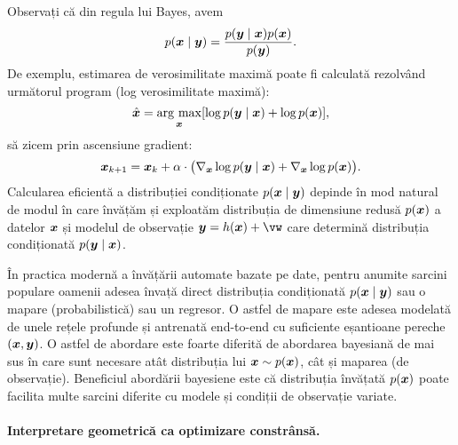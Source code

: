 \documentclass[../../book-main_ro.tex]{subfiles}
\begin{document}
Observați că din regula lui Bayes, avem
\begin{equation}
  p(\bm{x}\mid \bm{y}) = \frac{p(\bm{y}\mid \bm{x}) p(\bm{x}) }{p(\bm{y})}.
\end{equation} 
De exemplu, estimarea de verosimilitate maximă poate fi calculată rezolvând următorul program (log verosimilitate maximă):
\begin{equation}
    \hat{\bm{x}} = \operatorname*{arg\ max}_{\bm{x}} [\log p(\bm{y}\mid \bm{x}) + \log p(\bm{x})], 
\end{equation}
să zicem prin ascensiune gradient:
\begin{equation}
    \bm{x}_{k+1} = \bm{x}_k + \alpha \cdot \big(\nabla_{\bm{x}} \log p(\bm{y} \mid \bm{x}) + \nabla_{\bm{x}} \log p(\bm{x})\big).
    \label{eqn:loglikelihoo-gradient-ascent}
\end{equation}
Calcularea eficientă a distribuției condiționate $p(\bm{x} \mid \bm{y})$ depinde în mod natural de modul în care învățăm și exploatăm distribuția de dimensiune redusă $p(\bm{x})$ a datelor $\bm{x}$ și modelul de observație $\y = h(\x) + \vw$ care determină distribuția condiționată $p(\bm{y} \mid \bm{x})$.

\begin{remark}
În practica modernă a învățării automate bazate pe date, pentru anumite sarcini populare oamenii adesea învață direct distribuția condiționată $p(\bm{x}\mid \bm{y})$ sau o mapare (probabilistică) sau un regresor. O astfel de mapare este adesea modelată de unele rețele profunde și antrenată end-to-end cu suficiente eșantioane pereche $(\bm{x}, \bm{y})$. O astfel de abordare este foarte diferită de abordarea bayesiană de mai sus în care sunt necesare atât distribuția lui $\bm{x} \sim p(\bm{x})$, cât și maparea (de observație). Beneficiul abordării bayesiene este că distribuția învățată $p(\bm{x})$ poate facilita multe sarcini diferite cu modele și condiții de observație variate.
\end{remark}

\paragraph{Interpretare geometrică ca optimizare constrânsă.}
\end{document}
